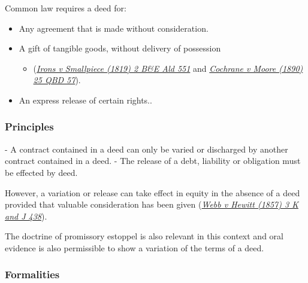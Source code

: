 \documentclass[
]{article}
\newenvironment{Shaded}{}{}
\newcommand{\NormalTok}[1]{#1}
\providecommand{\tightlist}{%
  \setlength{\itemsep}{0pt}\setlength{\parskip}{0pt}}
\begin{document}
Common law requires a deed for:

\begin{itemize}
\tightlist
\item
  Any agreement that is made without consideration.
\item
  A gift of tangible goods, without delivery of possession

  \begin{itemize}
  \tightlist
  \item
    (\emph{\href{https://uk.practicallaw.thomsonreuters.com/D-016-1484?originationContext=document\&transitionType=PLDocumentLink\&contextData=(sc.Default)\&ppcid=0e69ecc7bd0b425c8c07be4517611bac}{Irons
    v Smallpiece (1819) 2 B\&E Ald 551}} and
    \emph{\href{https://uk.practicallaw.thomsonreuters.com/D-016-1485?originationContext=document\&transitionType=PLDocumentLink\&contextData=(sc.Default)\&ppcid=0e69ecc7bd0b425c8c07be4517611bac}{Cochrane
    v Moore (1890) 25 QBD 57}}).
  \end{itemize}
\item
  An express release of certain rights..
\end{itemize}

\hypertarget{principles}{%
\subsubsection{Principles}\label{principles}}

\begin{Shaded}
\begin{Highlighting}[]
\NormalTok{{-} A contract contained in a deed can only be varied or discharged by another contract contained in a deed.}
\NormalTok{{-} The release of a debt, liability or obligation must be effected by deed.}
\end{Highlighting}
\end{Shaded}

However, a variation or release can take effect in equity in the absence
of a deed provided that valuable consideration has been given
(\emph{\href{https://uk.practicallaw.thomsonreuters.com/D-009-7407?originationContext=document\&transitionType=PLDocumentLink\&contextData=(sc.Default)\&ppcid=0e69ecc7bd0b425c8c07be4517611bac}{Webb
v Hewitt (1857) 3 K and J 438}}).

The doctrine of promissory estoppel is also relevant in this context and
oral evidence is also permissible to show a variation of the terms of a
deed.

\hypertarget{formalities}{%
\subsubsection{Formalities}\label{formalities}}
\end{document}
